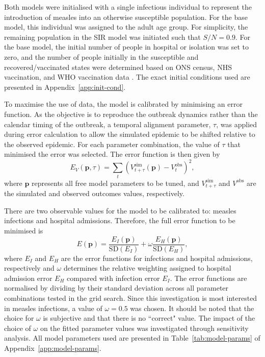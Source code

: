 \documentclass[12pt]{article}
\begin{document}
Both models were initialised with a single infectious individual to represent the introduction of measles into an otherwise susceptible population. For the base model, this individual was assigned to the adult age group. For simplicity, the remaining population in the SIR model was initiated such that $S/N=0.9$. For the base model, the initial number of people in hospital or isolation was set to zero, and the number of people initially in the susceptible and recovered/vaccinated states were determined based on ONS census, NHS vaccination, and WHO vaccination data \cite{ONS2021census, NHSEngland2026FDP, WHO_measles_coverage}. The exact initial conditions used are presented in Appendix~\ref{app:init-cond}. 

To maximise the use of data, the model is calibrated by minimising an error function. As the objective is to reproduce the outbreak dynamics rather than the calendar timing of the outbreak, a temporal alignment parameter, $\tau$, was applied during error calculation to allow the simulated epidemic to be shifted relative to the observed epidemic. For each parameter combination, the value of $\tau$ that minimised the error was selected. The error function is then given by
%
\begin{equation}
    E_V(\mathbf{p}, \tau) = \sum_t\left( V_{t+\tau}^{\text{sim}}(\mathbf{p}) - V_t^{\text{obs}}\right)^2, 
    \label{eq:error}
\end{equation}
%
where $\mathbf{p}$ represents all free model parameters to be tuned, and $V_{t+\tau}^{\text{sim}}$ and $V^{\text{obs}}$ are the simulated and observed outcomes values, respectively. 

There are two observable values for the model to be calibrated to: measles infections and hospital admissions. Therefore, the full error function to be minimised is
%
\begin{equation}
    E(\mathbf{p}) = \frac{E_I(\mathbf{p})}{\mathrm{SD}(E_I)} + \omega \frac{E_H(\mathbf{p})}{\mathrm{SD}(E_H)},
    \label{eq:error-comb}
\end{equation}
%
where $E_I$ and $E_H$ are the error functions for infections and hospital admissions, respectively and $\omega$ determines the relative weighting assigned to hospital admission error $E_H$ compared with infection error $E_I$. The error functions are normalised by dividing by their standard deviation across all parameter combinations tested in the grid search. Since this investigation is most interested in measles infections, a value of $\omega = 0.5$ was chosen. It should be noted that the choice for $\omega$ is subjective and that there is no ``correct" value. The impact of the choice of $\omega$ on the fitted parameter values was investigated through sensitivity analysis. All model parameters used are presented in Table~\ref{tab:model-params} of Appendix~\ref{app:model-params}. 
\end{document}
